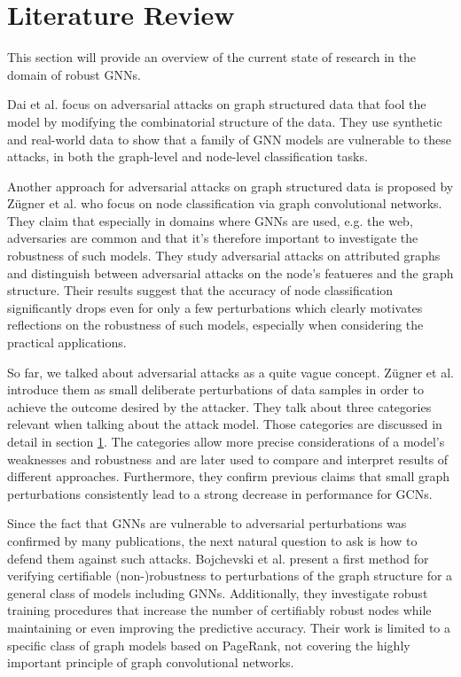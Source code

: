 \documentclass[a4paper,preprint]{sig-alternate}
\begin{document}
\section{Literature Review}

This section will provide an overview of the current state of research in the domain of robust GNNs.\newline

Dai et al. \cite{dai2018adversarial} focus on adversarial attacks on graph structured data that fool the model by modifying the
combinatorial structure of the data. They use synthetic and real-world data to show that a family of GNN models are vulnerable
to these attacks, in both the graph-level and node-level classification tasks.\newline

Another approach for adversarial attacks on graph structured data is proposed by Zügner et al. \cite{Z_gner_2018} who focus on node classification
via graph convolutional networks.
They claim that especially in domains where GNNs are used, e.g. the web, adversaries are common and that it's therefore important
to investigate the robustness of such models. They study adversarial attacks on attributed graphs and distinguish between
adversarial attacks on the node's featueres and the graph structure. Their results suggest that the accuracy of node classification
significantly drops even for only a few perturbations which clearly motivates reflections on the robustness of such models, especially
when considering the practical applications.\newline

So far, we talked about adversarial attacks as a quite vague concept. Zügner et al. \cite{zuegner2019adversarial}
introduce them as small deliberate perturbations of data samples in order to achieve the outcome desired by the attacker.
They talk about three categories relevant when talking about the attack model. Those categories are discussed in detail in section \ref{}.
The categories allow more precise considerations of a model's weaknesses and robustness and are later used to compare and interpret results of 
different approaches. Furthermore, they confirm previous claims that small graph perturbations consistently lead to a strong decrease 
in performance for GCNs.\newline

Since the fact that GNNs are vulnerable to adversarial perturbations was confirmed by many publications, the next natural question to ask
is how to defend them against such attacks. Bojchevski et al. \cite{bojchevski2019certifiable} present a first method for verifying certifiable
(non-)robustness to perturbations of the graph structure for a general class of models including GNNs. Additionally, they investigate robust 
training procedures that increase the number of certifiably robust nodes while maintaining or even improving the predictive accuracy.
Their work is limited to a specific class of graph models based on PageRank, not covering the highly important principle of graph convolutional
networks. \cite{10.1145/3394486.3403217}\newline
\end{document}
